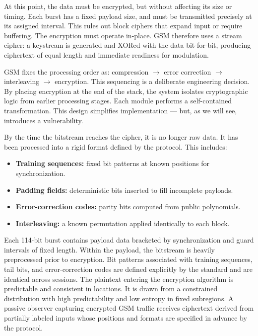 At this point, the data must be encrypted, but without affecting its size or timing. Each burst has a fixed payload size, and must be transmitted precisely at its assigned interval. This rules out block ciphers that expand input or require buffering. The encryption must operate in-place. GSM therefore uses a stream cipher: a keystream is generated and XORed with the data bit-for-bit, producing ciphertext of equal length and immediate readiness for modulation.

GSM fixes the processing order as: compression $\rightarrow$ error correction $\rightarrow$ interleaving $\rightarrow$ encryption. This sequencing is a deliberate engineering decision. By placing encryption at the end of the stack, the system isolates cryptographic logic from earlier processing stages. Each module performs a self-contained transformation. This design simplifies implementation — but, as we will see, introduces a vulnerability.

By the time the bitstream reaches the cipher, it is no longer raw data. It has been processed into a rigid format defined by the protocol. This includes:

\begin{itemize}
  \item \textbf{Training sequences:} fixed bit patterns at known positions for synchronization.
  \item \textbf{Padding fields:} deterministic bits inserted to fill incomplete payloads.
  \item \textbf{Error-correction codes:} parity bits computed from public polynomials.
  \item \textbf{Interleaving:} a known permutation applied identically to each block.
\end{itemize}

Each 114-bit burst contains payload data bracketed by synchronization and guard intervals of fixed length. Within the payload, the bitstream is heavily preprocessed prior to encryption. Bit patterns associated with training sequences, tail bits, and error-correction codes are defined explicitly by the standard and are identical across sessions. The plaintext entering the encryption algorithm is predictable and consistent in locations. It is drawn from a constrained distribution with high predictability and low entropy in fixed subregions. A passive observer capturing encrypted GSM traffic receives ciphertext derived from partially labeled inputs whose positions and formats are specified in advance by the protocol.

